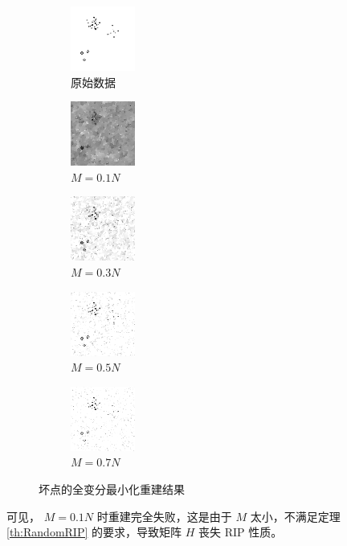 \begin{figure}
\centering
\begin{subfigure}[t]{1.1in}
	\includegraphics{Figure/testdata/0d.png}
	\caption{原始数据}
\end{subfigure}
\begin{subfigure}[t]{1.1in}
	\includegraphics{Figure/TV/0d10.png}
	\caption{$M = 0.1 N$}
\end{subfigure}
\begin{subfigure}[t]{1.1in}
	\includegraphics{Figure/TV/0d30.png}
	\caption{$M = 0.3 N$}
\end{subfigure}
\begin{subfigure}[t]{1.1in}
	\includegraphics{Figure/TV/0d50.png}
	\caption{$M = 0.5 N$}
\end{subfigure}
\begin{subfigure}[t]{1.1in}
	\includegraphics{Figure/TV/0d70.png}
	\caption{$M = 0.7 N$}
\end{subfigure}
\caption{坏点的全变分最小化重建结果}
\label{fig:TV0d}
\end{figure}

可见， $M = 0.1 N$ 时重建完全失败，这是由于 $M$ 太小，不满足定理
\ref{th:RandomRIP} 的要求，导致矩阵 $H$ 丧失 RIP 性质。


